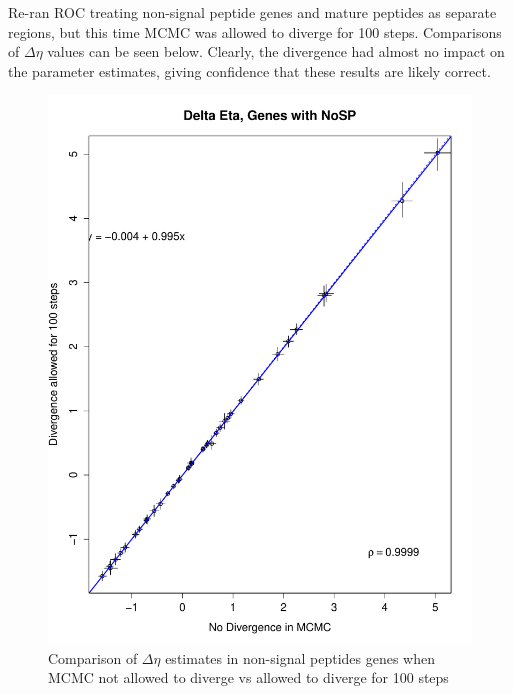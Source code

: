 \documentclass[11pt]{labbook}
\begin{document}


Re-ran ROC treating non-signal peptide genes and mature peptides as separate regions, but this time MCMC was allowed to diverge for 100 steps. Comparisons of $\Delta\eta$ values can be seen below. Clearly, the divergence had almost no impact on the parameter estimates, giving confidence that these results are likely correct. 

\begin{figure}[H]
\centering
\includegraphics[page=1,scale=0.6]{Ecoli_results/Nosp_w_mp_cat_divergence_100/Graphs/Comp_nosp_no_divergence_to_divergence_100.pdf}
\caption{Comparison of $\Delta\eta$ estimates in non-signal peptides genes when MCMC not allowed to diverge vs allowed to diverge for 100 steps}
\end{figure}
\end{document}
